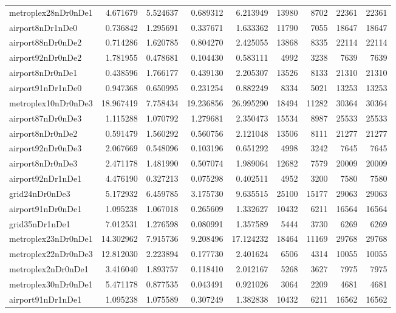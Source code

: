 \begin{longtable}{|l|r|r|r|r|r|r|r|r|}
metroplex28nDr0nDe1 & 4.671679 & 5.524637 & 0.689312 & 6.213949 & 13980 & 8702 & 22361 & 22361 \\
airport8nDr1nDe0 & 0.736842 & 1.295691 & 0.337671 & 1.633362 & 11790 & 7055 & 18647 & 18647 \\
airport88nDr0nDe2 & 0.714286 & 1.620785 & 0.804270 & 2.425055 & 13868 & 8335 & 22114 & 22114 \\
airport92nDr0nDe2 & 1.781955 & 0.478681 & 0.104430 & 0.583111 & 4992 & 3238 & 7639 & 7639 \\
airport8nDr0nDe1 & 0.438596 & 1.766177 & 0.439130 & 2.205307 & 13526 & 8133 & 21310 & 21310 \\
airport91nDr1nDe0 & 0.947368 & 0.650995 & 0.231254 & 0.882249 & 8334 & 5021 & 13253 & 13253 \\
metroplex10nDr0nDe3 & 18.967419 & 7.758434 & 19.236856 & 26.995290 & 18494 & 11282 & 30364 & 30364 \\
airport87nDr0nDe3 & 1.115288 & 1.070792 & 1.279681 & 2.350473 & 15534 & 8987 & 25533 & 25533 \\
airport8nDr0nDe2 & 0.591479 & 1.560292 & 0.560756 & 2.121048 & 13506 & 8111 & 21277 & 21277 \\
airport92nDr0nDe3 & 2.067669 & 0.548096 & 0.103196 & 0.651292 & 4998 & 3242 & 7645 & 7645 \\
airport8nDr0nDe3 & 2.471178 & 1.481990 & 0.507074 & 1.989064 & 12682 & 7579 & 20009 & 20009 \\
airport92nDr1nDe1 & 4.476190 & 0.327213 & 0.075298 & 0.402511 & 4952 & 3200 & 7580 & 7580 \\
grid24nDr0nDe3 & 5.172932 & 6.459785 & 3.175730 & 9.635515 & 25100 & 15177 & 29063 & 29063 \\
airport91nDr0nDe1 & 1.095238 & 1.067018 & 0.265609 & 1.332627 & 10432 & 6211 & 16564 & 16564 \\
grid35nDr1nDe1 & 7.012531 & 1.276598 & 0.080991 & 1.357589 & 5444 & 3730 & 6269 & 6269 \\
metroplex23nDr0nDe1 & 14.302962 & 7.915736 & 9.208496 & 17.124232 & 18464 & 11169 & 29768 & 29768 \\
metroplex22nDr0nDe3 & 12.812030 & 2.223894 & 0.177730 & 2.401624 & 6506 & 4314 & 10055 & 10055 \\
metroplex2nDr0nDe1 & 3.416040 & 1.893757 & 0.118410 & 2.012167 & 5268 & 3627 & 7975 & 7975 \\
metroplex30nDr0nDe1 & 5.471178 & 0.877535 & 0.043491 & 0.921026 & 3064 & 2209 & 4681 & 4681 \\
airport91nDr1nDe1 & 1.095238 & 1.075589 & 0.307249 & 1.382838 & 10432 & 6211 & 16562 & 16562 \\

\end{longtable}
